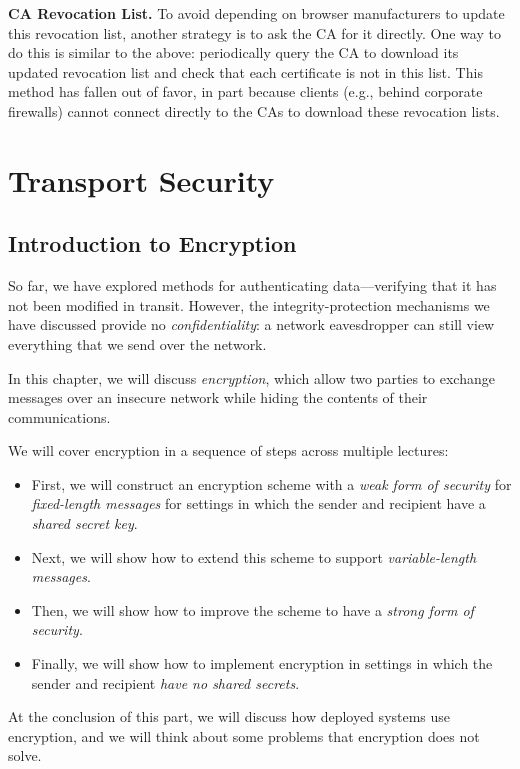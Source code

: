 \documentclass[
  letterpaper,
]{scrbook}
\providecommand{\tightlist}{%
  \setlength{\itemsep}{0pt}\setlength{\parskip}{0pt}}
\theoremstyle{definition}
\theoremstyle{plain}
\theoremstyle{plain}
\theoremstyle{remark}
\begin{document}
\textbf{CA Revocation List.} To avoid depending on browser manufacturers
to update this revocation list, another strategy is to ask the CA for it
directly. One way to do this is similar to the above: periodically query
the CA to download its updated revocation list and check that each
certificate is not in this list. This method has fallen out of favor, in
part because clients (e.g., behind corporate firewalls) cannot connect
directly to the CAs to download these revocation lists.

\part{Transport Security}

\chapter{Introduction to Encryption}\label{introduction-to-encryption}

So far, we have explored methods for authenticating data---verifying
that it has not been modified in transit. However, the
integrity-protection mechanisms we have discussed provide no
\emph{confidentiality}: a network eavesdropper can still view everything
that we send over the network.

In this chapter, we will discuss \emph{encryption}, which allow two
parties to exchange messages over an insecure network while hiding the
contents of their communications.

We will cover encryption in a sequence of steps across multiple
lectures:

\begin{itemize}
\tightlist
\item
  First, we will construct an encryption scheme with a \emph{weak form
  of security} for \emph{fixed-length messages} for settings in which
  the sender and recipient have a \emph{shared secret key}.
\item
  Next, we will show how to extend this scheme to support
  \emph{variable-length messages}.
\item
  Then, we will show how to improve the scheme to have a \emph{strong
  form of security}.
\item
  Finally, we will show how to implement encryption in settings in which
  the sender and recipient \emph{have no shared secrets}.
\end{itemize}

At the conclusion of this part, we will discuss how deployed systems use
encryption, and we will think about some problems that encryption does
not solve.
\end{document}
